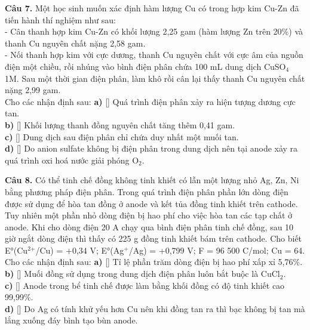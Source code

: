 \documentclass{article}
\begin{document}
\fontsize{22}{29}\selectfont
\textbf{Câu 7.} Một học sinh muốn xác định hàm lượng Cu có trong hợp kim Cu-Zn đã tiến hành thí nghiệm như sau:\\ 
- Cân thanh hợp kim Cu-Zn có khối lượng 2,25 gam (hàm lượng Zn trên 20\%) và thanh Cu nguyên chất nặng 2,58 gam.\\ 
- Nối thanh hợp kim với cực dương, thanh Cu nguyên chất với cực âm của nguồn điện một chiều, rồi nhúng vào bình điện phân chứa 100 mL dung dịch CuSO$_{\text{4}}$ 1M. Sau một thời gian điện phân, làm khô rồi cân lại thấy thanh Cu nguyên chất nặng 2,99 gam.\\ 
Cho các nhận định sau:
\vspace{6pt}
\textbf{a)} [\quad] Quá trình điện phân xảy ra hiện tượng dương cực tan.\\[4pt]
\textbf{b)} [\quad] Khối lượng thanh đồng nguyên chất tăng thêm 0,41 gam.\\[4pt]
\textbf{c)} [\quad] Dung dịch sau điện phân chỉ chứa duy nhất một muối tan.\\[4pt]
\textbf{d)} [\quad] Do anion sulfate không bị điện phân trong dung dịch nên tại anode xảy ra quá trình oxi hoá nước giải phóng O$_{\text{2}}$.\\[4pt]
\vspace*{\fill}
\newpage

\fontsize{22}{29}\selectfont
\textbf{Câu 8.} Có thể tinh chế đồng không tinh khiết có lẫn một lượng nhỏ Ag, Zn, Ni bằng phương pháp điện phân. Trong quá trình điện phân phần lớn dòng điện được sử dụng để hòa tan đồng ở anode và kết tủa đồng tinh khiết trên cathode. Tuy nhiên một phần nhỏ dòng điện bị hao phí cho việc hòa tan các tạp chất ở anode. Khi cho dòng điện 20 A chạy qua bình điện phân tinh chế đồng, sau 10 giờ ngắt dòng điện thì thấy có 225 g đồng tinh khiết bám trên cathode. Cho biết E°(Cu$^{\text{2+}}$/Cu) = +0,34 V; E°(Ag$^{\text{+}}$/Ag) = +0,799 V; F = 96 500 C/mol; Cu = 64. Cho các nhận định sau:
\vspace{6pt}
\textbf{a)} [\quad] Tỉ lệ phần trăm dòng điện bị hao phí xấp xỉ 5,76\%.\\[4pt]
\textbf{b)} [\quad] Muối đồng sử dụng trong dung dịch điện phân luôn bắt buộc là CuCl$_{\text{2}}$.\\[4pt]
\textbf{c)} [\quad] Anode trong bể tinh chế được làm bằng khối đồng có độ tinh khiết cao 99,99\%.\\[4pt]
\textbf{d)} [\quad] Do Ag có tính khử yếu hơn Cu nên khi đồng tan ra thì bạc không bị tan mà lắng xuống đáy bình tạo bùn anode.\\[4pt]
\vspace*{\fill}
\newpage
\end{document}
